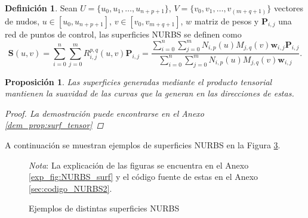 \documentclass[11pt]{book}
\theoremstyle{plain} %
\newtheorem{proposicion}[teorema]{Proposición}
\theoremstyle{definition} %
\newtheorem*{defin}{Definición} %
\theoremstyle{definition} %
\begin{document}
\begin{defin}
    Sean $U = \{u_0, u_1, \ldots, u_{n+p+1}\}$, $V = \{v_0, v_1, \ldots, v_{(m+q+1)}\}$  vectores de nudos, $u \in [u_0, u_{n+p+1}]$, $v\in [v_0, v_{m+q+1}]$, $w$ matriz de pesos y $\mathbf{P}_{i,j}$ una red de puntos de control,
    las superficies NURBS se definen como
    \begin{equation}
        \label{eq:NURBS_Surf}
        \mathbf{S}(u, v) = \sum_{i=0}^{n} \sum_{j=0}^{m} R_{i,j}^{p,q}(u, v) \mathbf{P}_{i,j}= \frac{\sum_{i=0}^{n} \sum_{j=0}^{m} N_{i,p}(u) M_{j,q}(v) \mathbf{w}_{i,j} \mathbf{P}_{i,j}}{\sum_{i=0}^{n} \sum_{j=0}^{m} N_{i,p}(u) M_{j,q}(v) \mathbf{w}_{i,j}}.
    \end{equation}
\end{defin}

\begin{proposicion}
    \label{prop:surf_tensor}
    Las superficies generadas mediante el producto tensorial mantienen la suavidad de las curvas que la generan en las direcciones de estas.
    \begin{proof}
        La demostración puede encontrarse en el Anexo \ref{dem_prop:surf_tensor}
    \end{proof}
\end{proposicion}

A continuación se muestran ejemplos de superficies NURBS en la Figura \ref{fig:NURBS_surf}.

\begin{figure}[H]
    \centering
    \begin{subfigure}{0.32\textwidth}
        
        \label{fig:NURBS_surf_1}
    \end{subfigure}
    \begin{subfigure}{0.32\textwidth}
        \scriptsize
        
        \label{fig:NURBS_surf_2}
    \end{subfigure}
    \caption{Ejemplos de distintas superficies NURBS}\label{fig:NURBS_surf}
    \vspace{-0.2cm} 
    \begin{flushleft}
        \footnotesize{\textit{Nota}: La explicación de las figuras se encuentra en el Anexo \ref{exp_fig:NURBS_surf} y el código fuente de estas en el Anexo \ref{sec:codigo_NURBS2}.}
    \end{flushleft}
\end{figure}
\end{document}
